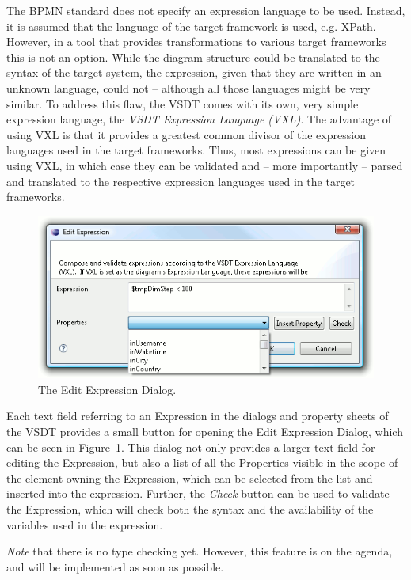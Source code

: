The BPMN standard does not specify an expression language to be used.  Instead,
it is assumed that the language of the target framework is used, e.g.  XPath.
However, in a tool that provides transformations to various target frameworks
this is not an option.  While the diagram structure could be translated to the
syntax of the target system, the expression, given that they are written in an
unknown language, could not -- although all those languages might be very similar.
To address this flaw, the VSDT comes with its own, very simple expression language,
the \emph{VSDT Expression Language (VXL)}.  The advantage of using VXL is that it
provides a greatest common divisor of the expression languages used in the target
frameworks.  Thus, most expressions can be given using VXL, in which case they
can be validated and -- more importantly -- parsed and translated to the
respective expression languages used in the target frameworks.

\begin{figure}[ht]
	\centering
	\includegraphics[width=.5\textwidth]{figures/features/editExp.png}
	\caption{The Edit Expression Dialog.}
	\label{fig:editExp}
\end{figure}

Each text field referring to an Expression in the dialogs and property sheets of
the VSDT provides a small button for opening the Edit Expression Dialog, which
can be seen in Figure~\ref{fig:editExp}.  This dialog not only provides a larger
text field for editing the Expression, but also a list of all the Properties visible
in the scope of the element owning the Expression, which can be selected from the
list and inserted into the expression.  Further, the \emph{Check} button can be
used to validate the Expression, which will check both the syntax and the
availability of the variables used in the expression.

\emph{Note} that there is no type checking yet.  However, this feature is on the
agenda, and will be implemented as soon as possible.




